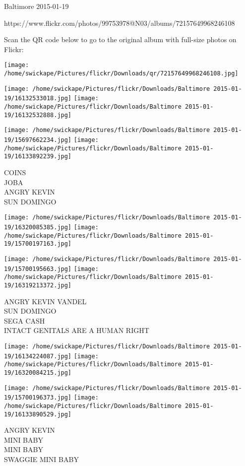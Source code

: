 \documentclass[10pt,letterpaper]{article}
\begin{document}
Baltimore 2015-01-19

https://www.flickr.com/photos/99753978@N03/albums/72157649968246108

Scan the QR code below to go to the original album with full-size photos on Flickr:

\texttt{[image: /home/swickape/Pictures/flickr/Downloads/qr/72157649968246108.jpg]}
\pagebreak

\texttt{[image: /home/swickape/Pictures/flickr/Downloads/Baltimore 2015-01-19/16132533018.jpg]}
\texttt{[image: /home/swickape/Pictures/flickr/Downloads/Baltimore 2015-01-19/16132532888.jpg]}

\texttt{[image: /home/swickape/Pictures/flickr/Downloads/Baltimore 2015-01-19/15697662234.jpg]}
\texttt{[image: /home/swickape/Pictures/flickr/Downloads/Baltimore 2015-01-19/16133892239.jpg]}

COINS\\
JOBA\\
ANGRY KEVIN\\
SUN DOMINGO\\
\pagebreak

\texttt{[image: /home/swickape/Pictures/flickr/Downloads/Baltimore 2015-01-19/16320085385.jpg]}
\texttt{[image: /home/swickape/Pictures/flickr/Downloads/Baltimore 2015-01-19/15700197163.jpg]}

\texttt{[image: /home/swickape/Pictures/flickr/Downloads/Baltimore 2015-01-19/15700195663.jpg]}
\texttt{[image: /home/swickape/Pictures/flickr/Downloads/Baltimore 2015-01-19/16319213372.jpg]}

ANGRY KEVIN VANDEL\\
SUN DOMINGO\\
SEGA CASH\\
INTACT GENITALS ARE A HUMAN RIGHT\\
\pagebreak

\texttt{[image: /home/swickape/Pictures/flickr/Downloads/Baltimore 2015-01-19/16134224087.jpg]}
\texttt{[image: /home/swickape/Pictures/flickr/Downloads/Baltimore 2015-01-19/16320084215.jpg]}

\texttt{[image: /home/swickape/Pictures/flickr/Downloads/Baltimore 2015-01-19/15700196373.jpg]}
\texttt{[image: /home/swickape/Pictures/flickr/Downloads/Baltimore 2015-01-19/16133890529.jpg]}

ANGRY KEVIN\\
MINI BABY\\
MINI BABY\\
SWAGGIE MINI BABY\\
\pagebreak
\end{document}
